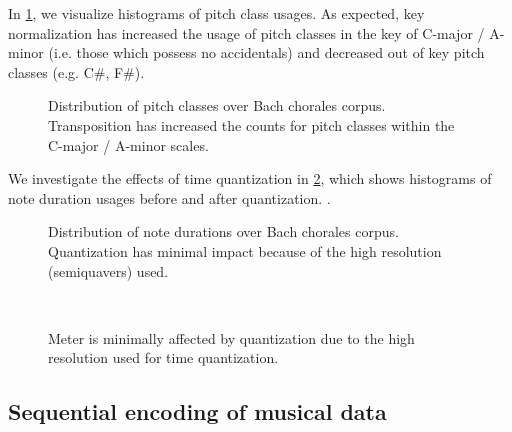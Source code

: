 In \cref{fig:pc-key-standardization}, we visualize histograms of pitch class usages.
As expected, key normalization has increased the usage of pitch classes in the key of
C-major / A-minor (i.e. those which possess no accidentals) and decreased out of key
pitch classes (e.g. C\#, F\#).

\begin{figure}
    \centering
    \caption{Distribution of pitch classes over Bach chorales corpus. Transposition has increased the counts
    for pitch classes within the C-major / A-minor scales.}
    \label{fig:pc-key-standardization}
\end{figure}

We investigate the effects of time quantization in
\cref{fig:note-lengths-time-quantization}, which shows histograms of note
duration usages before and after quantization. .

\begin{figure}[tb]
    \centering
    \begin{subfigure}[t]{0.48\textwidth}
        \centering
        
    \end{subfigure}
    \begin{subfigure}[t]{0.48\textwidth}
        \centering
        
    \end{subfigure}
    \caption{Distribution of note durations over Bach chorales corpus. Quantization has minimal impact
    because of the high resolution (semiquavers) used.}
    \label{fig:note-lengths-time-quantization}
\end{figure}

\begin{figure}[tb]
    \centering
    \begin{subfigure}[t]{0.48\textwidth}
        \centering
        
    \end{subfigure}
    ~
    \begin{subfigure}[t]{0.48\textwidth}
        \centering
        
    \end{subfigure}
    \caption{Meter is minimally affected by quantization due to the high resolution used for
    time quantization.}
    \label{fig:meter-time-quantization}
\end{figure}

\subsection{Sequential encoding of musical data}
\label{sec:sequential-encoding}

